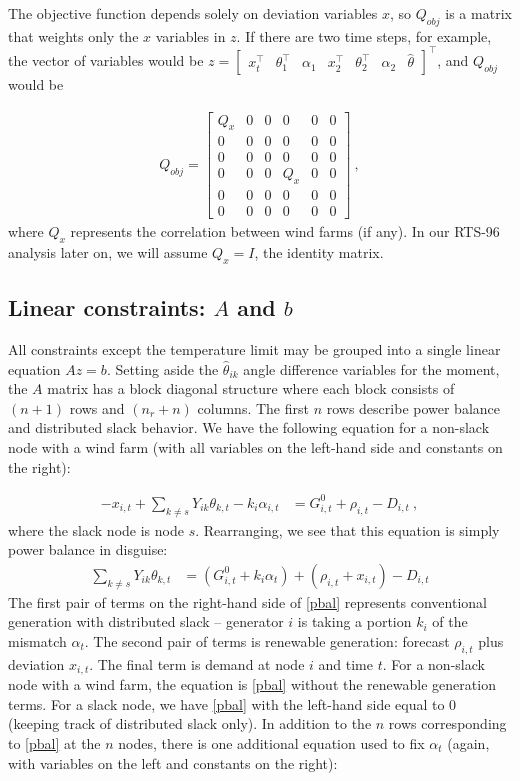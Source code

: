 \documentclass[conference]{IEEEtran}
\begin{document}
The objective function depends solely on deviation variables $x$, so $Q_{obj}$ is a matrix that weights only the $x$ variables in $z$. If there are two time steps, for example, the vector of variables would be $z = \begin{bmatrix}x_t^\top & \theta_1^\top & \alpha_1 & x_2^\top & \theta_2^\top & \alpha_2 & \hat{\theta}\end{bmatrix}^\top$, and $Q_{obj}$ would be

\begin{align*}
Q_{obj} = \begin{bmatrix} Q_x & 0 & 0 & 0 & 0 & 0 \\ 0 & 0 & 0 & 0 & 0 & 0 \\ 0 & 0  & 0 & 0 & 0 & 0 \\ 0 & 0 & 0 & Q_x & 0 & 0 \\ 0 & 0 & 0 & 0 & 0 & 0 \\ 0 & 0 & 0 & 0 & 0 & 0\end{bmatrix}~,
\end{align*}
where $Q_x$ represents the correlation between wind farms (if any). In our RTS-96 analysis later on, we will assume $Q_x=I$, the identity matrix.

\subsection{Linear constraints: $A$ and $b$}

All constraints except the temperature limit may be grouped into a single linear equation $Az=b$. Setting aside the $\hat{\theta}_{ik}$ angle difference variables for the moment, the $A$ matrix has a block diagonal structure where each block consists of $(n+1)$ rows and $(n_r+n)$ columns. The first $n$ rows describe power balance and distributed slack behavior. We have the following equation for a non-slack node with a wind farm (with all variables on the left-hand side and constants on the right):

\begin{align*}
-x_{i,t} + \sum\limits_{k\neq s} Y_{ik}\theta_{k,t} - k_i\alpha_{i,t} &= G_{i,t}^0 + \rho_{i,t} - D_{i,t}~,
\end{align*}
where the slack node is node $s$. Rearranging, we see that this equation is simply power balance in disguise:
\begin{align}\label{pbal}
\sum\limits_{k\neq s} Y_{ik}\theta_{k,t}  &= (G_{i,t}^0 + k_i\alpha_t) + (\rho_{i,t} + x_{i,t}) - D_{i,t}
\end{align}
The first pair of terms on the right-hand side of \eqref{pbal} represents conventional generation with distributed slack -- generator $i$ is taking a portion $k_i$ of the mismatch $\alpha_t$. The second pair of terms is renewable generation: forecast $\rho_{i,t}$ plus deviation $x_{i,t}$. The final term is demand at node $i$ and time $t$. For a non-slack node with a wind farm, the equation is \eqref{pbal} without the renewable generation terms. For a slack node, we have \eqref{pbal} with the left-hand side equal to 0 (keeping track of distributed slack only). In addition to the $n$ rows corresponding to \eqref{pbal} at the $n$ nodes, there is one additional equation used to fix $\alpha_t$ (again, with variables on the left and constants on the right):
\end{document}
